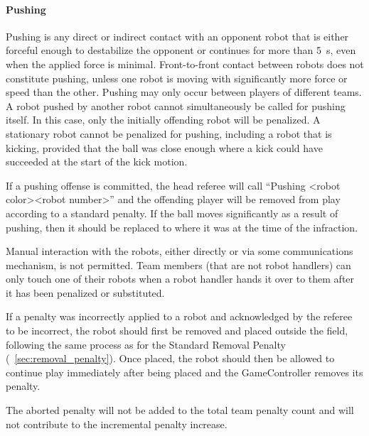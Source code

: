 \paragraph{Pushing}
\label{sec:player_pushing}

Pushing is any direct or indirect contact with an opponent robot that is either forceful enough to destabilize the opponent or continues for more than \qty{5}{\second}, even when the applied force is minimal. Front-to-front contact between robots does not constitute pushing, unless one robot is moving with significantly more force or speed than the other. Pushing may only occur between players of different teams. A robot pushed by another robot cannot simultaneously be called for pushing itself. In this case, only the initially offending robot will be penalized. A stationary robot cannot be penalized for pushing, including a robot that is kicking, provided that the ball was close enough where a kick could have succeeded at the start of the kick motion.

If a pushing offense is committed, the head referee will call ``Pushing \textless robot color\textgreater \textless robot number\textgreater'' and the offending player will be removed from play according to a standard penalty. If the ball moves significantly as a result of pushing, then it should be replaced to where it was at the time of the infraction.

\label{sec:manual_interaction}

Manual interaction with the robots, either directly or via some communications mechanism, is not permitted. Team members (that are not robot handlers) can only touch one of their robots when a robot handler hands it over to them after it has been penalized or substituted.

\label{sec:aborting_penalty}

If a penalty was incorrectly applied to a robot and acknowledged by the referee to be incorrect, the robot should first be removed and placed outside the field, following the same process as for the Standard Removal Penalty (\cf~\cref{sec:removal_penalty}). Once placed, the robot should then be allowed to continue play immediately after being placed and the GameController removes its penalty.

The aborted penalty will not be added to the total team penalty count and will not contribute to the incremental penalty increase.

\label{sec:untangling}

